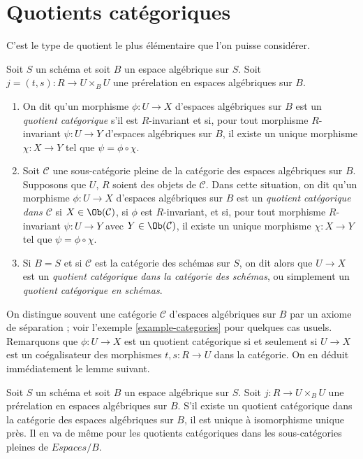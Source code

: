 \section{Quotients catégoriques}
\label{section-categorical}

\noindent
C'est le type de quotient le plus élémentaire que l'on puisse considérer.

\begin{definition}
\label{definition-categorical}
Soit $S$ un schéma et soit $B$ un espace algébrique sur $S$.
Soit $j = (t, s) : R \to U \times_B U$ une prérelation en espaces algébriques
sur $B$.
\begin{enumerate}
\item On dit qu'un morphisme $\phi : U \to X$ d'espaces algébriques sur $B$
est un {\it quotient catégorique} s'il est $R$-invariant et si,
pour tout morphisme $R$-invariant $\psi : U \to Y$ d'espaces algébriques sur $B$,
il existe un unique morphisme $\chi : X \to Y$ tel que
$\psi = \phi \circ \chi$.
\item Soit $\mathcal{C}$ une sous-catégorie pleine de la catégorie des espaces
algébriques sur $B$. Supposons que $U$, $R$ soient des objets de $\mathcal{C}$.
Dans cette situation, on dit
qu'un morphisme $\phi : U \to X$ d'espaces algébriques sur $B$
est un {\it quotient catégorique dans $\mathcal{C}$}
si $X \in \Ob(\mathcal{C})$, si $\phi$ est $R$-invariant,
et si, pour tout morphisme $R$-invariant
$\psi : U \to Y$ avec $Y \in \Ob(\mathcal{C})$,
il existe un unique morphisme $\chi : X \to Y$ tel
que $\psi = \phi \circ \chi$.
\item Si $B = S$ et si $\mathcal{C}$ est la catégorie des schémas sur $S$,
on dit alors que $U \to X$ est un
{\it quotient catégorique dans la catégorie des schémas}, ou simplement un
{\it quotient catégorique en schémas}.
\end{enumerate}
\end{definition}

\noindent
On distingue souvent une catégorie $\mathcal{C}$ d'espaces algébriques sur $B$
par un axiome de séparation ; voir
l'exemple \ref{example-categories}
pour quelques cas usuels.
Remarquons que $\phi : U \to X$ est un quotient catégorique si et seulement
si $U \to X$ est un coégalisateur des
morphismes $t, s : R \to U$ dans la catégorie. On en déduit immédiatement
le lemme suivant.

\begin{lemma}
\label{lemma-categorical-unique}
Soit $S$ un schéma et soit $B$ un espace algébrique sur $S$.
Soit $j : R \to U \times_B U$ une prérelation en espaces algébriques sur $B$.
S'il existe un quotient catégorique dans la catégorie des espaces algébriques
sur $B$, il est unique à isomorphisme unique près.
Il en va de même pour les quotients catégoriques dans les sous-catégories pleines de
$\textit{Espaces}/B$.
\end{lemma}

